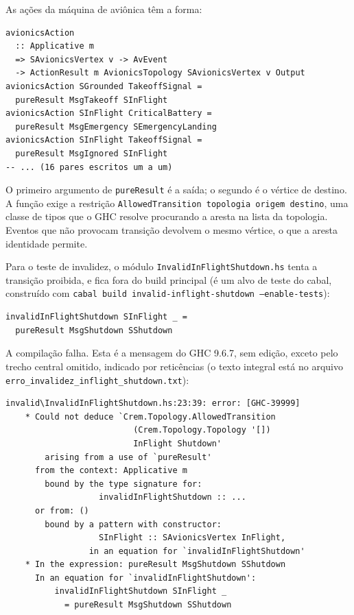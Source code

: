 \documentclass[12pt,a4paper]{article}
\begin{document}
As ações da máquina de aviônica têm a forma:

\begin{verbatim}
avionicsAction
  :: Applicative m
  => SAvionicsVertex v -> AvEvent
  -> ActionResult m AvionicsTopology SAvionicsVertex v Output
avionicsAction SGrounded TakeoffSignal =
  pureResult MsgTakeoff SInFlight
avionicsAction SInFlight CriticalBattery =
  pureResult MsgEmergency SEmergencyLanding
avionicsAction SInFlight TakeoffSignal =
  pureResult MsgIgnored SInFlight
-- ... (16 pares escritos um a um)
\end{verbatim}

O primeiro argumento de \texttt{pureResult} é a saída; o segundo é o vértice de destino. A função exige a restrição \texttt{AllowedTransition topologia origem destino}, uma classe de tipos que o GHC resolve procurando a aresta na lista da topologia. Eventos que não provocam transição devolvem o mesmo vértice, o que a aresta identidade permite.

Para o teste de invalidez, o módulo \texttt{InvalidInFlightShutdown.hs} tenta a transição proibida, e fica fora do build principal (é um alvo de teste do cabal, construído com \texttt{cabal build invalid-inflight-shutdown --enable-tests}):

\begin{verbatim}
invalidInFlightShutdown SInFlight _ =
  pureResult MsgShutdown SShutdown
\end{verbatim}

A compilação falha. Esta é a mensagem do GHC 9.6.7, sem edição, exceto pelo trecho central omitido, indicado por reticências (o texto integral está no arquivo \texttt{erro\_invalidez\_inflight\_shutdown.txt}):

\begin{verbatim}
invalid\InvalidInFlightShutdown.hs:23:39: error: [GHC-39999]
    * Could not deduce `Crem.Topology.AllowedTransition
                          (Crem.Topology.Topology '[])
                          InFlight Shutdown'
        arising from a use of `pureResult'
      from the context: Applicative m
        bound by the type signature for:
                   invalidInFlightShutdown :: ...
      or from: ()
        bound by a pattern with constructor:
                   SInFlight :: SAvionicsVertex InFlight,
                 in an equation for `invalidInFlightShutdown'
    * In the expression: pureResult MsgShutdown SShutdown
      In an equation for `invalidInFlightShutdown':
          invalidInFlightShutdown SInFlight _
            = pureResult MsgShutdown SShutdown
\end{verbatim}
\end{document}
